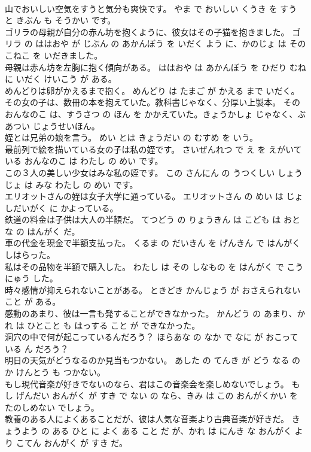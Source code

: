 \documentclass[8pt]{extreport}
\begin{document}
\begin{CJK}{UTF8}{min}
\\	山でおいしい空気をすうと気分も爽快です。	やま で おいしい くうき を すう と きぶん も そうかい です。	
\\	ゴリラの母親が自分の赤ん坊を抱くように、彼女はその子猫を抱きました。	ゴリラ の ははおや が じぶん の あかんぼう を いだく よう に、かのじょ は その こねこ を いだきました。	
\\	母親は赤ん坊を左胸に抱く傾向がある。	ははおや は あかんぼう を ひだり むね に いだく けいこう が ある。	
\\	めんどりは卵がかえるまで抱く。	めんどり は たまご が かえる まで いだく。	
\\	その女の子は、数冊の本を抱えていた。教科書じゃなく、分厚い上製本。	その おんなのこ は、すうさつ の ほん を かかえていた。きょうかしょ じゃなく、ぶあつい じょうせいほん。	
\\	姪とは兄弟の娘を言う。	めい とは きょうだい の むすめ を いう。	
\\	最前列で絵を描いている女の子は私の姪です。	さいぜんれつ で え を えがいている おんなのこ は わたし の めい です。	
\\	この３人の美しい少女はみな私の姪です。	この さんにん の うつくしい しょうじょ は みな わたし の めい です。	
\\	エリオットさんの姪は女子大学に通っている。	エリオットさん の めい は じょしだいがく に かよっている。	
\\	鉄道の料金は子供は大人の半額だ。	てつどう の りょうきん は こども は おとな の はんがく だ。	
\\	車の代金を現金で半額支払った。	くるま の だいきん を げんきん で はんがく しはらった。	
\\	私はその品物を半額で購入した。	わたし は その しなもの を はんがく で こうにゅう した。	
\\	時々感情が抑えられないことがある。	ときどき かんじょう が おさえられない こと が ある。	
\\	感動のあまり、彼は一言も発することができなかった。	かんどう の あまり、かれ は ひとこと も はっする こと が できなかった。	
\\	洞穴の中で何が起こっているんだろう？	ほらあな の なか で なに が おこっている ん だろう？	
\\	明日の天気がどうなるのか見当もつかない。	あした の てんき が どう なる のか けんとう も つかない。	
\\	もし現代音楽が好きでないのなら、君はこの音楽会を楽しめないでしょう。	もし げんだい おんがく が すき で ない の なら、きみ は この おんがくかい を たのしめない でしょう。	
\\	教養のある人によくあることだが、彼は人気な音楽より古典音楽が好きだ。	きょうよう の ある ひと に よく ある こと だ が、かれ は にんき な おんがく より こてん おんがく が すき だ。	

\end{CJK}
\end{document}
